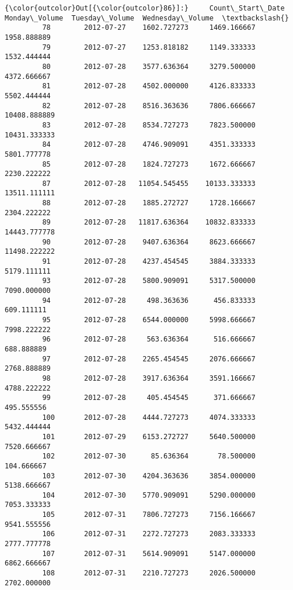 \documentclass[11pt]{article}
\begin{document}
\begin{Verbatim}[commandchars=\\\{\}]
{\color{outcolor}Out[{\color{outcolor}86}]:}     Count\_Start\_Date  Monday\_Volume  Tuesday\_Volume  Wednesday\_Volume  \textbackslash{}
         78        2012-07-27    1602.727273     1469.166667       1958.888889   
         79        2012-07-27    1253.818182     1149.333333       1532.444444   
         80        2012-07-28    3577.636364     3279.500000       4372.666667   
         81        2012-07-28    4502.000000     4126.833333       5502.444444   
         82        2012-07-28    8516.363636     7806.666667      10408.888889   
         83        2012-07-28    8534.727273     7823.500000      10431.333333   
         84        2012-07-28    4746.909091     4351.333333       5801.777778   
         85        2012-07-28    1824.727273     1672.666667       2230.222222   
         87        2012-07-28   11054.545455    10133.333333      13511.111111   
         88        2012-07-28    1885.272727     1728.166667       2304.222222   
         89        2012-07-28   11817.636364    10832.833333      14443.777778   
         90        2012-07-28    9407.636364     8623.666667      11498.222222   
         91        2012-07-28    4237.454545     3884.333333       5179.111111   
         93        2012-07-28    5800.909091     5317.500000       7090.000000   
         94        2012-07-28     498.363636      456.833333        609.111111   
         95        2012-07-28    6544.000000     5998.666667       7998.222222   
         96        2012-07-28     563.636364      516.666667        688.888889   
         97        2012-07-28    2265.454545     2076.666667       2768.888889   
         98        2012-07-28    3917.636364     3591.166667       4788.222222   
         99        2012-07-28     405.454545      371.666667        495.555556   
         100       2012-07-28    4444.727273     4074.333333       5432.444444   
         101       2012-07-29    6153.272727     5640.500000       7520.666667   
         102       2012-07-30      85.636364       78.500000        104.666667   
         103       2012-07-30    4204.363636     3854.000000       5138.666667   
         104       2012-07-30    5770.909091     5290.000000       7053.333333   
         105       2012-07-31    7806.727273     7156.166667       9541.555556   
         106       2012-07-31    2272.727273     2083.333333       2777.777778   
         107       2012-07-31    5614.909091     5147.000000       6862.666667   
         108       2012-07-31    2210.727273     2026.500000       2702.000000   

\end{Verbatim}
\end{document}
